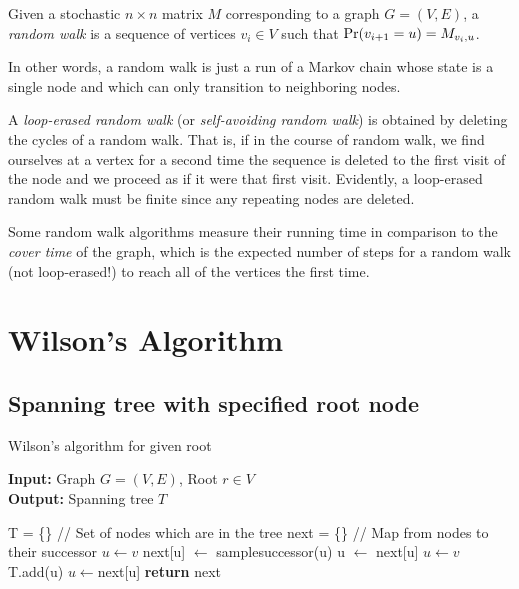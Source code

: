 \documentclass[11pt]{article}
\begin{document}
\begin{defn}
Given a stochastic $n\times n$ matrix $M$ corresponding to a graph $G = (V, E)$,
a \emph{random walk} is a sequence of vertices $v_i \in V$ such that
$\text{Pr}(v_{i+1} = u) = M_{v_i,u}$.
\end{defn}

In other words, a random walk is just a run of a Markov chain whose state is a
single node and which can only transition to neighboring nodes.

A \emph{loop-erased random walk} (or \emph{self-avoiding random walk}) is
obtained by deleting the cycles of a random walk. That is, if in the course of
random walk, we find ourselves at a vertex for a second time the sequence is
deleted to the first visit of the node and we proceed as if it were that first
visit. Evidently, a loop-erased random walk must be finite since any repeating
nodes are deleted.

Some random walk algorithms measure their running time in
comparison to the \emph{cover time} of the graph, which is the expected number
of steps for a random walk (not loop-erased!) to reach all of the vertices the
first time.


\section{Wilson's Algorithm}\label{wilson}
\subsection{Spanning tree with specified root node}
\begin{algorithm}
\caption{Wilson's algorithm for given root}
\label{alg:root}
\textbf{Input: }Graph $G=(V,E)$, Root $r \in V$ \\
\textbf{Output: }Spanning tree $T$ \\
\begin{algorithmic}[1]
\STATE T = \{\}                   // Set of nodes which are in the tree
\STATE next = \{\}                // Map from nodes to their successor
\STATE $u \leftarrow v$
\label{walk}
\STATE next[u] $\leftarrow$ samplesuccessor(u)
\STATE u $\leftarrow$ next[u]
\ENDWHILE \label{endwalk}
\STATE $u \leftarrow v$
 \label{adjoin}
\STATE T.add(u)
\STATE $u \leftarrow $next[u]
\ENDWHILE \label{endadjoin}
\ENDFOR
\STATE \textbf{return} next
\end{algorithmic}
\end{algorithm}
\end{document}
